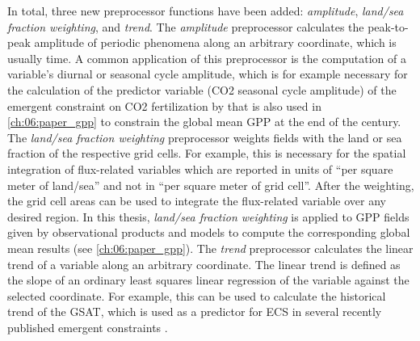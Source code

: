 In total, three new preprocessor functions have been added: \emph{amplitude},
\emph{land/sea fraction weighting}, and \emph{trend}. The \emph{amplitude}
preprocessor calculates the peak-to-peak amplitude of periodic phenomena along
an arbitrary coordinate, which is usually time. A common application of this
preprocessor is the computation of a variable's diurnal or seasonal cycle
amplitude, which is for example necessary for the calculation of the predictor
variable (\ac{CO2} seasonal cycle amplitude) of the emergent constraint on
\ac{CO2} fertilization by \textcite{Wenzel2016} that is also used in
\cref{ch:06:paper_gpp} to constrain the global mean \ac{GPP} at the end of the
 century. The \emph{land/sea fraction weighting} preprocessor weights
fields with the land or sea fraction of the respective grid cells. For example,
this is necessary for the spatial integration of flux-related variables which
are reported in units of \enquote{per square meter of land/sea} and not in
\enquote{per square meter of grid cell}. After the weighting, the grid cell
areas can be used to integrate the flux-related variable over any desired
region. In this thesis, \emph{land/sea fraction weighting} is applied to
\ac{GPP} fields given by observational products and models to compute the
corresponding global mean results (see \cref{ch:06:paper_gpp}). The
\emph{trend} preprocessor calculates the linear trend of a variable along an
arbitrary coordinate. The linear trend is defined as the slope of an ordinary
least squares linear regression of the variable against the selected
coordinate. For example, this can be used to calculate the historical trend of
the \ac{GSAT}, which is used as a predictor for \ac{ECS} in several recently
published emergent constraints \autocite{JimenezdelaCuesta2019, Nijsse2020,
  Tokarska2020}.

